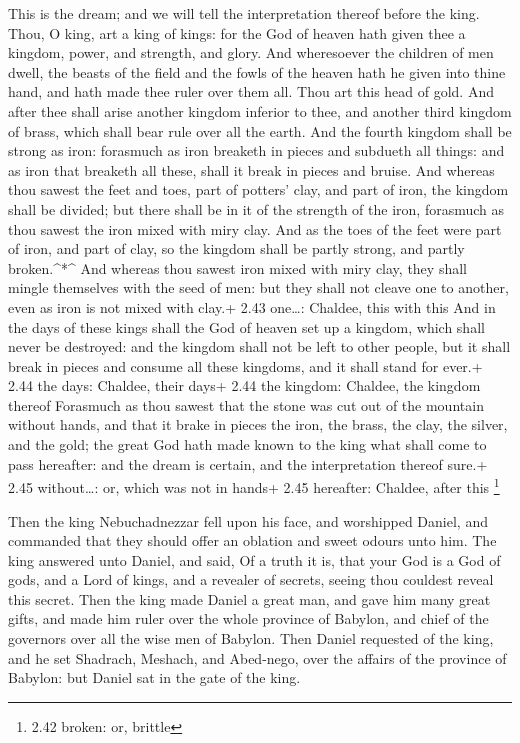 This is the dream; and we will tell the interpretation
thereof before the king.  Thou, O king, art a king of
kings: for the God of heaven hath given thee a kingdom, power, and
strength, and glory.  And wheresoever the children of men
dwell, the beasts of the field and the fowls of the heaven hath he given
into thine hand, and hath made thee ruler over them all. Thou art this
head of gold.  And after thee shall arise another kingdom
inferior to thee, and another third kingdom of brass, which shall bear
rule over all the earth.  And the fourth kingdom shall be
strong as iron: forasmuch as iron breaketh in pieces and subdueth all
things: and as iron that breaketh all these, shall it break in pieces
and bruise.  And whereas thou sawest the feet and toes,
part of potters' clay, and part of iron, the kingdom shall be divided;
but there shall be in it of the strength of the iron, forasmuch as thou
sawest the iron mixed with miry clay.  And as the toes of
the feet were part of iron, and part of clay, so the kingdom shall be
partly strong, and partly broken.\^{}*\^{}  And whereas
thou sawest iron mixed with miry clay, they shall mingle themselves with
the seed of men: but they shall not cleave one to another, even as iron
is not mixed with clay.+ 2.43 one\ldots: Chaldee, this with this
 And in the days of these kings shall the God of heaven set
up a kingdom, which shall never be destroyed: and the kingdom shall not
be left to other people, but it shall break in pieces and consume all
these kingdoms, and it shall stand for ever.+ 2.44 the days: Chaldee,
their days+ 2.44 the kingdom: Chaldee, the kingdom thereof 
Forasmuch as thou sawest that the stone was cut out of the mountain
without hands, and that it brake in pieces the iron, the brass, the
clay, the silver, and the gold; the great God hath made known to the
king what shall come to pass hereafter: and the dream is certain, and
the interpretation thereof sure.+ 2.45 without\ldots: or, which was not
in hands+ 2.45 hereafter: Chaldee, after this \footnote{2.42 broken: or,
  brittle}

 Then the king Nebuchadnezzar fell upon his face, and
worshipped Daniel, and commanded that they should offer an oblation and
sweet odours unto him.  The king answered unto Daniel, and
said, Of a truth it is, that your God is a God of gods, and a Lord of
kings, and a revealer of secrets, seeing thou couldest reveal this
secret.  Then the king made Daniel a great man, and gave
him many great gifts, and made him ruler over the whole province of
Babylon, and chief of the governors over all the wise men of Babylon.
 Then Daniel requested of the king, and he set Shadrach,
Meshach, and Abed-nego, over the affairs of the province of Babylon: but
Daniel sat in the gate of the king.

